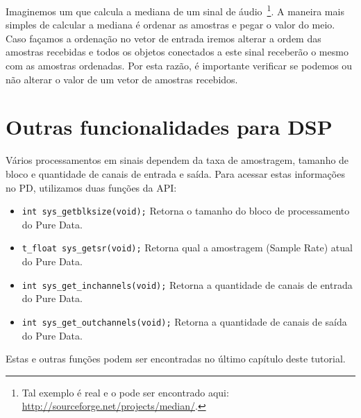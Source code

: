 Imaginemos um \external que calcula a mediana de um sinal de
áudio~\footnote{Tal exemplo é real e o \external pode ser encontrado aqui:
\url{http://sourceforge.net/projects/median/}.}.
A maneira mais simples de calcular a mediana é ordenar as amostras e pegar o
valor do meio.
Caso façamos a ordenação no vetor de entrada iremos alterar a ordem das amostras
recebidas e todos os objetos conectados a este sinal receberão o mesmo com as
amostras ordenadas.
Por esta razão, é importante verificar se podemos ou não alterar o valor de um
vetor de amostras recebidos.

\section{Outras funcionalidades para DSP}

Vários processamentos em sinais dependem da taxa de amostragem, tamanho de bloco
e quantidade de canais de entrada e saída.
Para acessar estas informações no PD, utilizamos duas funções da API:

\begin{itemize}
\item \texttt{int sys\_getblksize(void);}
   Retorna o tamanho do bloco de processamento do Pure Data.
\item  \texttt{t\_float sys\_getsr(void);}
Retorna qual a amostragem (Sample Rate) atual do Pure Data.
\item \texttt{int sys\_get\_inchannels(void);}
Retorna a quantidade de canais de entrada do Pure Data.
\item \texttt{int sys\_get\_outchannels(void);}
Retorna a quantidade de canais de saída do Pure Data.
\end{itemize}

Estas e outras funções podem ser encontradas no último capítulo deste tutorial.
